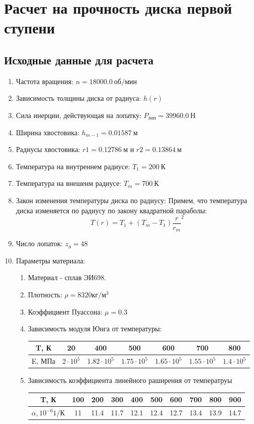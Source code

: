 \documentclass[a4paper,10pt]{article}
\begin{document}
\section{Расчет на прочность диска первой ступени}
\subsection{Исходные данные для расчета}
\begin{enumerate}
\item Частота вращения: $n = 18000.0\ об/мин$
\item Зависимость толщины диска от радиуса: $h\left( r \right)$
\item Сила инерции, действующая на лопатку: $P_{лоп} = 39960.0\ Н$
\item Ширина хвостовика: $h_{m-1} = 0.01587\ м$
\item Радиусы хвостовика: $r1 = 0.12786\ м$ и $r2 = 0.13864\ м$
\item Температура на внутреннем радиусе: $T_1 = 200\ К$
\item Температура на внешенм радиусе: $T_m = 700\ К$
\item Закон изменения температуры диска по радиусу: 
Примем, что температура диска изменяется по радиусу по закону квадратной параболы:
\[T\left( r \right) = T_1 + \left( T_m - T_1 \right) \frac{r}{r_m} ^2\]
\item Число лопаток: $z_{л} = 48$
\item Параметры материала:

\begin{enumerate}
	\item Материал - сплав ЭИ698.
	\item Плотность: $\rho = 8320 кг/м^3$
	\item Коэффициент Пуассона: $\mu = 0.3$
	\item Зависимость модуля Юнга от температуры:
	
	\begin{tabular}{|c|c|c|c|c|c|c|}
	\hline 
	T, К & 20 & 400 & 500 & 600 & 700 & 800 \\ 
	\hline 
	E, МПа & $2\cdot10^5$ & $1.82\cdot10^5$ & $1.75\cdot10^5$ & $1.65\cdot10^5$ & $1.55\cdot10^5$ & $1.4\cdot10^5$ \\ 
	\hline 
	\end{tabular} 
	
	\item Зависимость коэффициента линейного раширения от температруы
	
	\begin{tabular}{|c|c|c|c|c|c|c|c|c|c|}
	\hline 
	T, К & 100 & 200 & 300 & 400 & 500 & 600 & 700 & 800 & 900 \\ 
	\hline 
	$\alpha, 10^{-6} 1/К$ & 11 & 11.4 & 11.7 & 12.1 & 12.4 & 12.7 & 13.4 & 13.9 & 14.7 \\ 
	\hline 
	\end{tabular} 
	

\end{enumerate}
\end{enumerate}
\end{document}
